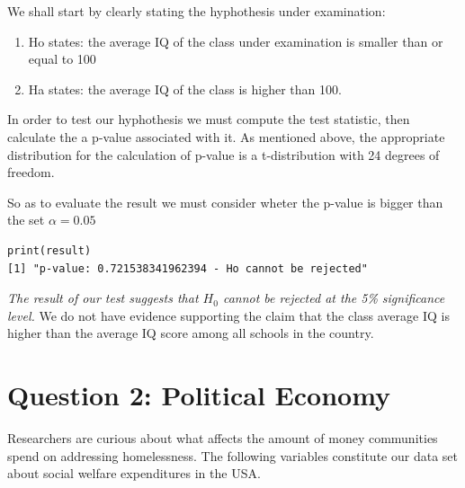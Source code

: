 \documentclass[12pt,letterpaper]{article}
\begin{document}
\vspace{0.5cm}
\noindent We shall start by clearly stating the hyphothesis under examination: \\
\vspace{.5cm}
\begin{enumerate}
	\item Ho states: the average IQ of the class under examination is smaller than or equal to 100\\
	\item Ha states: the average IQ of the class is higher than 100.\\ 
\end{enumerate}
\vspace{.5cm}
\noindent In order to test our hyphothesis we must compute the test statistic, then calculate the a p-value associated with it. As mentioned above, the appropriate distribution for the calculation of p-value is a t-distribution with 24 degrees of freedom. \\
\vspace{.5cm}
 
\vspace{.5cm}
\noindent So as to evaluate the result we must consider wheter the p-value is bigger than the set $\alpha=0.05$ \\
\vspace{.5cm}
 
\begin{verbatim}
print(result)
[1] "p-value: 0.721538341962394 - Ho cannot be rejected"
\end{verbatim}
\textit{The result of our test suggests that $H_0$ cannot be rejected at the 5\% significance level.} We do not have evidence supporting the claim that the class average IQ is higher than the average IQ score among all schools in the country.
\\ 

\newpage

	\section*{Question 2: Political Economy}

\noindent Researchers are curious about what affects the amount of money communities spend on addressing homelessness. The following variables constitute our data set about social welfare expenditures in the USA. \\
\vspace{.5cm}
\end{document}
